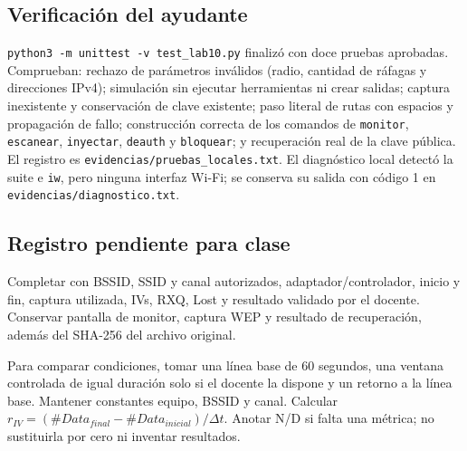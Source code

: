 \documentclass[11pt,a4paper]{article}
\begin{document}
\subsection*{Verificación del ayudante}
\texttt{python3 -m unittest -v test\_lab10.py} finalizó con doce pruebas
aprobadas. Comprueban: rechazo de parámetros inválidos (radio, cantidad de ráfagas
y direcciones IPv4); simulación sin ejecutar herramientas ni crear salidas; captura
inexistente y conservación de clave existente; paso literal de rutas con espacios y
propagación de fallo; construcción correcta de los comandos de \texttt{monitor},
\texttt{escanear}, \texttt{inyectar}, \texttt{deauth} y \texttt{bloquear}; y
recuperación real de la clave pública. El registro es
\texttt{evidencias/pruebas\_locales.txt}. El diagnóstico local detectó la suite
e \texttt{iw}, pero ninguna interfaz Wi-Fi; se conserva su salida con código 1
en \texttt{evidencias/diagnostico.txt}.

\subsection*{Registro pendiente para clase}
Completar  con BSSID, SSID y canal autorizados,
adaptador/controlador, inicio y fin, captura utilizada, IVs, RXQ, Lost y resultado
validado por el docente. Conservar pantalla de monitor, captura WEP y resultado
de recuperación, además del SHA-256 del archivo original.

Para comparar condiciones, tomar una línea base de 60 segundos, una ventana
controlada de igual duración solo si el docente la dispone y un retorno a la
línea base. Mantener constantes equipo, BSSID y canal. Calcular
\(r_{IV}=(\#Data_{final}-\#Data_{inicial})/\Delta t\).
Anotar N/D si falta una métrica; no sustituirla por cero ni inventar resultados.

\newpage
\end{document}
